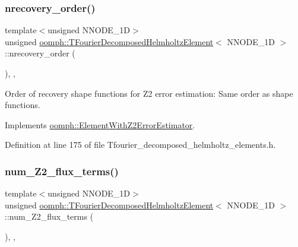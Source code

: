 \subsubsection{\texorpdfstring{nrecovery\+\_\+order()}{nrecovery\_order()}}
{\footnotesize\ttfamily template$<$unsigned N\+N\+O\+D\+E\+\_\+1D$>$ \\
unsigned \hyperlink{classoomph_1_1TFourierDecomposedHelmholtzElement}{oomph\+::\+T\+Fourier\+Decomposed\+Helmholtz\+Element}$<$ N\+N\+O\+D\+E\+\_\+1D $>$\+::nrecovery\+\_\+order (\begin{DoxyParamCaption}{ }\end{DoxyParamCaption})\hspace{0.3cm}{\ttfamily [inline]}, {\ttfamily [protected]}, {\ttfamily [virtual]}}



Order of recovery shape functions for Z2 error estimation\+: Same order as shape functions. 



Implements \hyperlink{classoomph_1_1ElementWithZ2ErrorEstimator_af39480835bd3e0f6b2f4f7a9a4044798}{oomph\+::\+Element\+With\+Z2\+Error\+Estimator}.



Definition at line 175 of file Tfourier\+\_\+decomposed\+\_\+helmholtz\+\_\+elements.\+h.

\mbox{\label{classoomph_1_1TFourierDecomposedHelmholtzElement_aba47a0cfee28a78ac416a49c91e6262a}} 
\subsubsection{\texorpdfstring{num\+\_\+\+Z2\+\_\+flux\+\_\+terms()}{num\_Z2\_flux\_terms()}}
{\footnotesize\ttfamily template$<$unsigned N\+N\+O\+D\+E\+\_\+1D$>$ \\
unsigned \hyperlink{classoomph_1_1TFourierDecomposedHelmholtzElement}{oomph\+::\+T\+Fourier\+Decomposed\+Helmholtz\+Element}$<$ N\+N\+O\+D\+E\+\_\+1D $>$\+::num\+\_\+\+Z2\+\_\+flux\+\_\+terms (\begin{DoxyParamCaption}{ }\end{DoxyParamCaption})\hspace{0.3cm}{\ttfamily [inline]}, {\ttfamily [protected]}, {\ttfamily [virtual]}}



